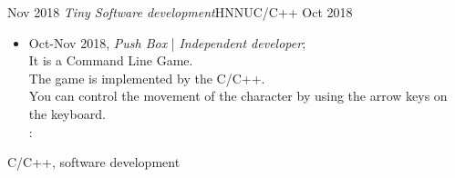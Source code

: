 \begin{experiences}
  \emptySeparator
  \experience
  { Nov 2018} {\emph{Tiny Software development}}{HNNU}{C/C++}
  { Oct 2018}		{
				  	\begin{itemize}                                                                       
				  		\item Oct-Nov 2018, \emph{Push Box} | \emph{Independent developer};\\
						It is a Command Line Game.\\
						The game is implemented by the C/C++.\\
						You can control the movement of the character by using the arrow keys on the keyboard.	\\
						\faGithub: 
				  	\end{itemize}
				  }
				  {C/C++, software development}
				  
\end{experiences}
